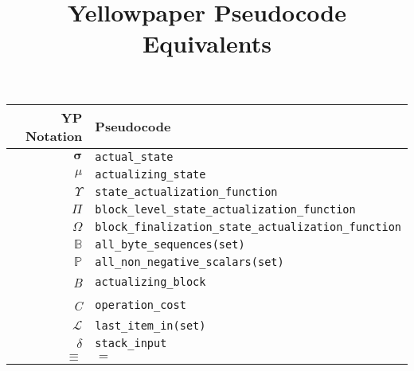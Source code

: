 \documentclass[9pt,a4paper,oneside]{scrartcl}
\author{}
\title{Yellowpaper Pseudocode Equivalents}
\date{}
\begin{document}
\maketitle
\centering
\begin{tabular}{rl}
	\hline
	\textbf{YP Notation} & \textbf{Pseudocode} \\
	\hline
	$\boldsymbol{\sigma}$ & \texttt{actual\_state} \\
	$\mu$ & \texttt{actualizing\_state} \\
	$\Upsilon$ & \texttt{state\_actualization\_function} \\
	$\Pi$ & \texttt{block\_level\_state\_actualization\_function} \\
	$\Omega$ & \texttt{block\_finalization\_state\_actualization\_function} \\
	$\mathbb{B}$ & \texttt{all\_byte\_sequences(set)} \\
	$\mathbb{P}$ & \texttt{all\_non\_negative\_scalars(set)} \\
	\textit{B} & \texttt{actualizing\_block} \\
	\textit{C} & \texttt{operation\_cost} \\
	$\mathcal{L}$ & \texttt{last\_item\_in(set)} \\
	$\delta$ & \texttt{stack\_input} \\
	$\equiv$ & $=$ \\

	\hline
\end{tabular}


\printbibliography
\end{document}
